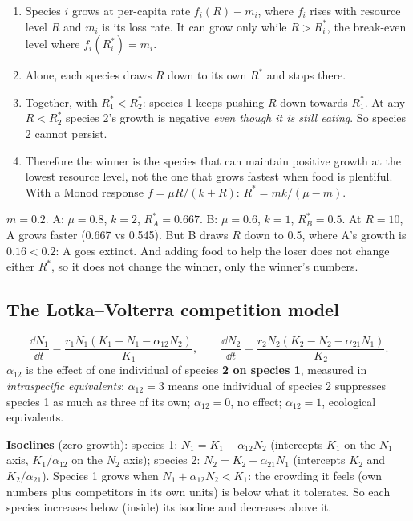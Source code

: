 \begin{chain}
\begin{enumerate}
\item Species $i$ grows at per-capita rate $f_i(R)-m_i$, where $f_i$ rises with resource level $R$ and $m_i$ is its
loss rate. It can grow only while $R>R^*_i$, the break-even level where $f_i(R^*_i)=m_i$.
\item Alone, each species draws $R$ down to its own $R^*$ and stops there.
\item Together, with $R^*_1<R^*_2$: species 1 keeps pushing $R$ down towards $R^*_1$. At any $R<R^*_2$ species 2's
growth is negative \emph{even though it is still eating}. So species 2 cannot persist.
\item Therefore the winner is the species that can maintain positive growth at the lowest resource level, not the one
that grows fastest when food is plentiful. With a Monod response $f=\mu R/(k+R)$: $R^*=mk/(\mu-m)$.
\end{enumerate}
\end{chain}

\begin{worked}
$m=0.2$. A: $\mu=0.8$, $k=2$, $R^*_A=0.667$. B: $\mu=0.6$, $k=1$, $R^*_B=0.5$. At $R=10$, A grows faster (0.667 vs
0.545). But B draws $R$ down to 0.5, where A's growth is $0.16<0.2$: A goes extinct. And adding food to help the loser
does not change either $R^*$, so it does not change the winner, only the winner's numbers.
\end{worked}

\subsection{The Lotka--Volterra competition model}
\[
\frac{\dd N_1}{\dd t}=\frac{r_1N_1(K_1-N_1-\alpha_{12}N_2)}{K_1},\qquad
\frac{\dd N_2}{\dd t}=\frac{r_2N_2(K_2-N_2-\alpha_{21}N_1)}{K_2}.
\]
$\alpha_{12}$ is the effect of one individual of species \textbf{2 on species 1}, measured in \emph{intraspecific
equivalents}: $\alpha_{12}=3$ means one individual of species 2 suppresses species 1 as much as three of its own;
$\alpha_{12}=0$, no effect; $\alpha_{12}=1$, ecological equivalents.

\textbf{Isoclines} (zero growth): species 1: $N_1=K_1-\alpha_{12}N_2$ (intercepts $K_1$ on the $N_1$ axis,
$K_1/\alpha_{12}$ on the $N_2$ axis); species 2: $N_2=K_2-\alpha_{21}N_1$ (intercepts $K_2$ and $K_2/\alpha_{21}$). Species 1
grows when $N_1+\alpha_{12}N_2<K_1$: the crowding it feels (own numbers plus competitors in its own units) is below what
it tolerates. So each species increases below (inside) its isocline and decreases above it.

